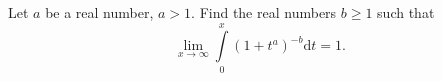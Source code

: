 Let $a$ be a real number, $a>1.$ Find the real numbers $b \ge 1$ such that $$\lim_{x \to \infty} \int\limits_0^x (1+t^a)^{-b} \mathrm{d}t=1.$$